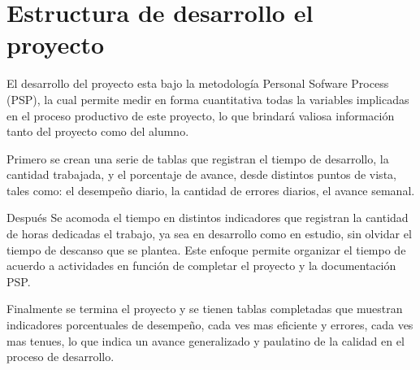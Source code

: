 \documentclass[a4paper,12pt,openany,oneside]{book}
\begin{document}
\section{Estructura de desarrollo el proyecto}
El desarrollo del proyecto esta bajo la metodología Personal Sofware Process (PSP), la cual permite medir en forma cuantitativa todas la variables implicadas en el proceso productivo de este proyecto, lo que brindará valiosa información tanto del proyecto como del alumno.

Primero se crean una serie de tablas que registran el tiempo de desarrollo, la cantidad trabajada, y el porcentaje de avance, desde distintos puntos de vista, tales como: el desempeño diario, la cantidad de errores diarios, el avance semanal.

Después Se acomoda el tiempo en distintos indicadores que registran la cantidad de horas dedicadas el trabajo, ya sea en desarrollo como en estudio, sin olvidar el tiempo de descanso que se plantea. Este enfoque permite organizar el tiempo de acuerdo a actividades en función de completar el proyecto y la documentación PSP.

Finalmente se termina el proyecto y se tienen tablas completadas que muestran indicadores porcentuales de desempeño, cada ves mas eficiente y errores, cada ves mas tenues, lo que indica un avance generalizado y paulatino de la calidad en el proceso de desarrollo.
\end{document}
